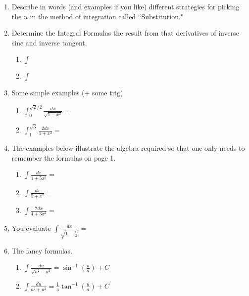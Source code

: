 \documentclass[11pt,fleqn]{article}
\def\ds{\displaystyle}
\begin{document}
\vspace*{-0.7in}

\begin{center}
  \Large{}
  \end{center}
\begin{enumerate}
\item Describe in words (and examples if you like) different strategies for picking the $u$ in the method of integration called ``Substitution."
\vspace{1in}
\item Determine the Integral Formulas the result from that derivatives of inverse sine and inverse tangent. 	\begin{multicols}{2}
	\begin{enumerate}
	\item $\ds{\int }$
	\columnbreak
	\item $\ds{\int }$	
	\end{enumerate}
	\end{multicols}
	\vspace{.2in}
\item Some simple examples  (+ some trig)
	\begin{enumerate}
	\item $\ds{\int_0^{\sqrt{2}/2} \frac{dx}{\sqrt{1-x^2}}}=$
	\vfill
	\item $\ds{\int_1^{\sqrt{3}} \frac{2dx}{1+x^2}}=$
	\vfill
	\end{enumerate}
\newpage
\item The examples below illustrate the algebra required so that one only needs to remember the formulas on page 1.
	\begin{enumerate}
	\item $\ds{\int \frac{dx}{1+5x^2}}=$
	\vfill
	\item $\ds{\int \frac{dx}{5+x^2}}=$
	\vfill
	\item $\ds{\int \frac{7dx}{4+3x^2}}=$
	\vfill
	\end{enumerate}
\item You evaluate $\ds{\int \frac{dx}{\sqrt{1-\frac{x^2}{2}}}}=$
	\vfill

\item The fancy formulas.
	\begin{multicols}{2}
	\begin{enumerate}
	
	\item $\ds{\int \frac{du}{ \sqrt{a^2-u^2}}= \sin^{-1}\left( \frac{u}{a}\right) +C}$
	\columnbreak
	\item $\ds{\int \frac{du}{{a^2+u^2}}}=\frac{1}{a}\tan^{-1}\left( \frac{u}{a}\right) +C$	
	\end{enumerate}
	\end{multicols}

	
\end{enumerate}
\end{document}
